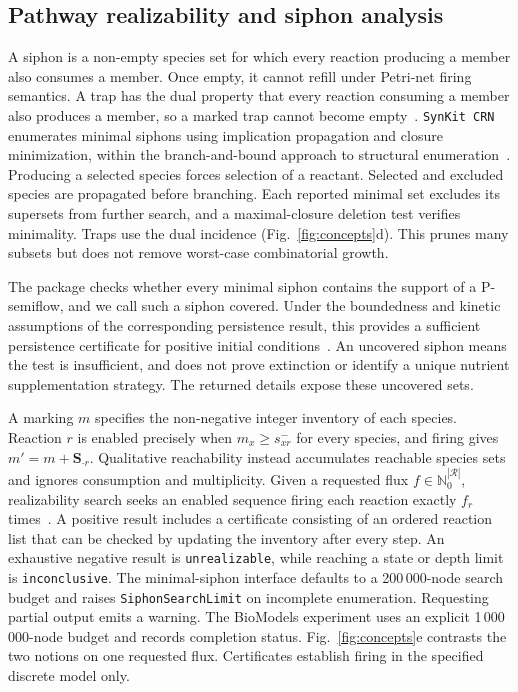 \documentclass[10pt,a4paper,fleqn]{article}
\newcommand{\synkitcrn}{\texttt{SynKit CRN}\xspace}
\begin{document}
\subsection{Pathway realizability and siphon analysis}
\label{sec:petrinet}
\label{sec:pathway}

A siphon is a non-empty species set for which every reaction producing a member also consumes a member. Once empty, it cannot refill under Petri-net firing semantics. A trap has the dual property that every reaction consuming a member also produces a member, so a marked trap cannot become empty~\cite{murata1989petri}. \synkitcrn enumerates minimal siphons using implication propagation and closure minimization, within the branch-and-bound approach to structural enumeration~\cite{cordone2005enumeration}. Producing a selected species forces selection of a reactant. Selected and excluded species are propagated before branching. Each reported minimal set excludes its supersets from further search, and a maximal-closure deletion test verifies minimality. Traps use the dual incidence (Fig.~\ref{fig:concepts}d). This prunes many subsets but does not remove worst-case combinatorial growth.

The package checks whether every minimal siphon contains the support of a P-semiflow, and we call such a siphon covered. Under the boundedness and kinetic assumptions of the corresponding persistence result, this provides a sufficient persistence certificate for positive initial conditions~\cite{angeli2007persistence}. An uncovered siphon means the test is insufficient, and does not prove extinction or identify a unique nutrient supplementation strategy. The returned details expose these uncovered sets.

A marking $m$ specifies the non-negative integer inventory of each species. Reaction $r$ is enabled precisely when $m_x\ge s^-_{xr}$ for every species, and firing gives $m'=m+\mathbf S_{\cdot r}$. Qualitative reachability instead accumulates reachable species sets and ignores consumption and multiplicity. Given a requested flux $f\in\mathbb N_0^{|\mathscr R|}$, realizability search seeks an enabled sequence firing each reaction exactly $f_r$ times~\cite{andersen2023realisability}. A positive result includes a certificate consisting of an ordered reaction list that can be checked by updating the inventory after every step. An exhaustive negative result is \texttt{unrealizable}, while reaching a state or depth limit is \texttt{inconclusive}. The minimal-siphon interface defaults to a 200\,000-node search budget and raises \texttt{SiphonSearchLimit} on incomplete enumeration. Requesting partial output emits a warning. The BioModels experiment uses an explicit 1\,000\,000-node budget and records completion status. Fig.~\ref{fig:concepts}e contrasts the two notions on one requested flux. Certificates establish firing in the specified discrete model only.
\end{document}
